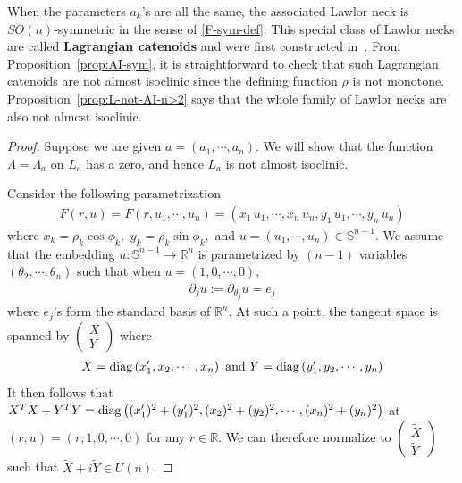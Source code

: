 \documentclass[11pt]{amsart}
\numberwithin{equation}{section}
\theoremstyle{definition}
\theoremstyle{definition}
\newcommand{\pr}[1]{\left(#1\right)}
\newcommand{\bb}[1]{\mathbb{#1}} \newcommand{\td}[1]{\widetilde{#1}}
\newcommand{\bd}{\partial}
\begin{document}
When the parameters $a_k$'s are all the same, the associated Lawlor neck is ${SO}(n)$-symmetric in the sense of \eqref{F-sym-def}.
This special class of Lawlor necks are called {\bf Lagrangian catenoids} and were first constructed in~\cite{HL}.
From Proposition~\ref{prop:AI-sym}, it is straightforward to check that such Lagrangian catenoids are not almost isoclinic since the defining function $\rho$ is not monotone.
Proposition~\ref{prop:L-not-AI-n>2} says that the whole family of Lawlor necks are also not almost isoclinic.

\begin{proof}
	Suppose we are given $a=(a_1,\cdots,a_n).$
	We will show that the function $\Lambda=\Lambda_a$ on $L_a$ has a zero, and hence $L_a$ is not almost isoclinic.
	
	Consider the following parametrization
	\begin{align*}
	F(r,u)
	= F(r,u_1,\cdots,u_n)
	= \pr{x_1\,u_1,
		\cdots ,
		x_n\,u_n,
		y_1\,u_1,
		\cdots,
		y_n\,u_n}
	\end{align*}
	where $x_k=\rho_k\cos\phi_k,$ $y_k=\rho_k\sin\phi_k,$ and $u=(u_1,\cdots,u_n)\in \mathbb S^{n-1}.$
	We assume that the embedding $u\colon \mathbb S^{n-1}\to\bb R^n$ is parametrized by $(n-1)$ variables $(\theta_2,\cdots,\theta_n)$ such that when $u=(1,0,\cdots,0),$
	\begin{align*}
	\bd_ju:=\bd_{\theta_j}u=e_j
	\end{align*}
	where $e_j$'s form the standard basis of $\bb R^n.$
	At such a point, the tangent space is spanned by $\begin{pmatrix}X\\Y
	    \end{pmatrix}$ where 
	\begin{align*}
	X={\rm diag}\pr{x_1', x_2,\cdots,x_n}
	\text{ and  }
	Y={\rm diag}\pr{y_1', y_2,\cdots,y_n}
	\end{align*}
	It then follows that $X^TX+Y^TY={\rm diag}\pr{(x_1')^2+(y_1')^2, (x_2)^2+(y_2)^2,\cdots,(x_n)^2+(y_n)^2}$ at $(r,u)=(r,1,0,\cdots,0)$ for any $r\in\bb R$. We can therefore normalize to $\begin{pmatrix}\td X\\\td Y
	    \end{pmatrix}$ such that $\td X+i\td Y\in U(n)$.
	

\end{proof}
\end{document}
